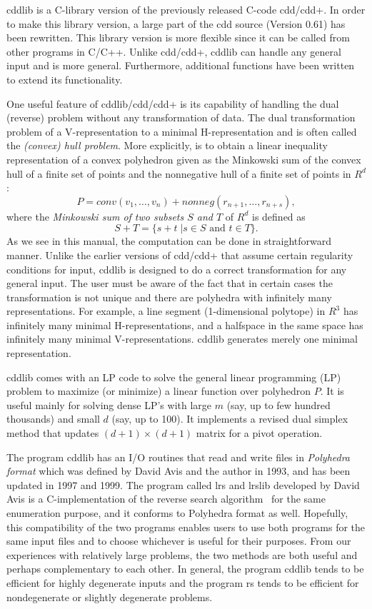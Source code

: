 \documentclass[11pt]{article}
\newcommand {\0} {{\bf 0}}
\begin{document}
cddlib is a C-library version of the previously released C-code cdd/cdd+.
In order to make this library version, a large part of the cdd source
(Version 0.61) has been rewritten.
This library version is more flexible since it can be called from other programs in C/C++.
Unlike cdd/cdd+, cddlib can handle any general input and is more general.
Furthermore,  additional functions have been written to extend its functionality.

One useful feature of  cddlib/cdd/cdd+ is its capability
of handling the dual (reverse)  problem without any transformation
of data.  The dual transformation problem of a V-representation
to a minimal H-representation and is often called the 
{\em (convex) hull problem\/}.  More explicitly,
is to obtain a linear inequality representation
of a convex polyhedron given as the Minkowski sum of 
the convex hull of a finite set of points and the nonnegative
hull of a finite set of points in $R^{d}$: 
\[
P = conv(v_1,\ldots,v_n) +  nonneg(r_{n+1},\ldots,r_{n+s}), 
\]
where
 the {\em Minkowski sum of two subsets $S$ and $T$} of $R^{d}$ is defined
as 
\[
S + T = \{ s + t \; |  s \in S \mbox{ and } t \in T \}.
\]
As we see in this manual, the computation can be done
in straightforward manner.  Unlike the earlier versions of
cdd/cdd+ that assume certain regularity conditions for input, 
cddlib is designed to do a correct transformation for any general input.
The user must be aware of the fact that in certain cases the
transformation is not unique and there are polyhedra with
infinitely many representations.  For example, a line
segment (1-dimensional polytope) in $R^3$ has infinitely
many minimal H-representations, and a halfspace in the same space
has infinitely many minimal V-representations.  cddlib generates
merely one minimal representation.

cddlib comes with an LP code to solve the general
linear programming (LP) problem to maximize (or minimize) a linear
function over polyhedron $P$.   It is useful mainly for solving 
dense LP's with large $m$ (say, up to few hundred thousands) and small $d$ 
(say, up to 100).  It implements a revised dual simplex method that
updates $(d+1)\times (d+1)$ matrix for a pivot operation.

The program cddlib has an I/O routines that read and write files in 
{\em Polyhedra format\/} which was defined by David Avis and
the author in 1993, and has been updated in 1997 and 1999.  
The program called lrs and lrslib \cite{a-lrshome-01} developed by David Avis is
a C-implementation of the reverse search algorithm~\cite{af-pachv-92} 
for the same enumeration purpose, and it conforms to Polyhedra format as well.
Hopefully, this compatibility of the two programs
enables users to use both programs for the same input files
and to choose whichever is useful for their purposes.
From our experiences with relatively large problems,
the two methods are both useful and perhaps complementary
to each other.  In general, the program cddlib tends to be
efficient for highly degenerate inputs and the program rs
tends to be efficient for nondegenerate or slightly
degenerate problems.
\end{document}
